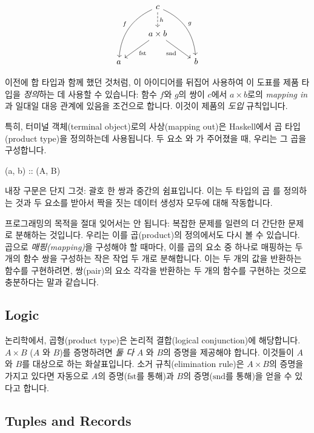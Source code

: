 \documentclass[DaoFP]{subfiles}
\begin{document}
\[
 \begin{tikzcd}
 & c
\arrow[d, dashed, "h"]
 \arrow[ddl, bend right, "f"']
 \arrow[ddr, bend left, "g"]
\\
&a \times b
 \arrow[dl,  "\text{fst}"]
  \arrow[dr,   "\text{snd}"']
\\
a && b
 \end{tikzcd}
\]

이전에 합 타입과 함께 했던 것처럼, 이 아이디어를 뒤집어 사용하여 이 도표를 제품 타입을 \emph{정의}하는 데 사용할 수 있습니다: 함수 $f$와 $g$의 쌍이 $c$에서 $a \times b$로의 \emph{mapping in}과 일대일 대응 관계에 있음을 조건으로 합니다. 이것이 제품의 \emph{도입} 규칙입니다.

특히, 터미널 객체(terminal object)로의 사상(mapping out)은 Haskell에서 곱 타입(product type)을 정의하는데 사용됩니다. 두 요소 와 가 주어졌을 때, 우리는 그 곱을 구성합니다.

\begin{haskell}
(a, b) :: (A, B)
\end{haskell}
내장 구문은 단지 그것: 괄호 한 쌍과 중간의 쉼표입니다. 이는 두 타입의 곱 를 정의하는 것과 두 요소를 받아서 짝을 짓는 데이터 생성자  모두에 대해 작동합니다.

프로그래밍의 목적을 절대 잊어서는 안 됩니다: 복잡한 문제를 일련의 더 간단한 문제로 분해하는 것입니다. 우리는 이를 곱(product)의 정의에서도 다시 볼 수 있습니다. 곱으로 \emph{매핑(mapping)}을 구성해야 할 때마다, 이를 곱의 요소 중 하나로 매핑하는 두 개의 함수 쌍을 구성하는 작은 작업 두 개로 분해합니다. 이는 두 개의 값을 반환하는 함수를 구현하려면, 쌍(pair)의 요소 각각을 반환하는 두 개의 함수를 구현하는 것으로 충분하다는 말과 같습니다.

\subsection{Logic}

논리학에서, 곱형(product type)은 논리적 결합(logical conjunction)에 해당합니다. $A \times B$ ($A$ 와 $B$)를 증명하려면 \emph{둘 다} $A$ 와 $B$의 증명을 제공해야 합니다. 이것들이 $A$와 $B$를 대상으로 하는 화살표입니다. 소거 규칙(elimination rule)은 $A \times B$의 증명을 가지고 있다면 자동으로 $A$의 증명($\text{fst}$를 통해)과 $B$의 증명($\text{snd}$를 통해)을 얻을 수 있다고 합니다.

\subsection{Tuples and Records}
\end{document}
